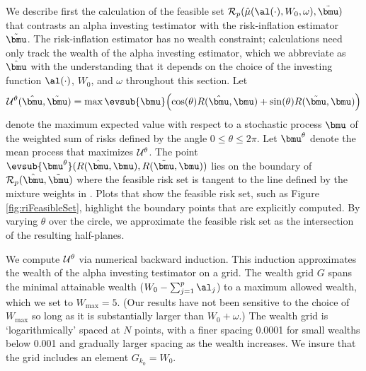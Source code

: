 \documentclass[12pt]{article}
\begin{document}
 We describe first the calculation of the feasible set ${\cal R}_p(\hat\mu(
 \al(\cdot), W_0, \omega), \tilde{\bmu})$ that contrasts an alpha investing
 testimator with the risk-inflation estimator $\tilde{\bmu}$.  The
 risk-inflation estimator has no wealth constraint; calculations need only track
 the wealth of the alpha investing estimator, which we abbreviate as
 $\hat{\bmu}$ with the understanding that it depends on the choice of the
 investing function $\al(\cdot)$, $W_0$, and $\omega$ throughout this section.
  Let
 \begin{equation}
   {\cal U}^\theta(\hat{\bmu},\tilde{\bmu}) = 
       \max \evsub{\bmu} \Bigl(
       \cos(\theta) R(\hat{\bmu}, \bmu) + \sin(\theta) R(\tilde{\bmu},\bmu) 
       \Bigr)
 \label{eq:U}
 \end{equation}
 denote the maximum expected value with respect to a stochastic process $\bmu$
 of the weighted sum of risks defined by the angle $ 0 \le \theta \le 2 \pi$.
  Let $\bmu^\theta$ denote the mean process that maximizes ${\cal U}^\theta$.  The
 point $\evsub{\bmu^\theta}(R(\hat{\bmu}, \bmu), R(\tilde{\bmu}, \bmu))$ lies on
 the boundary of ${\cal R}_p(\hat{\bmu},\tilde{\bmu})$ where the feasible risk
 set is tangent to the line defined by the mixture weights in .  Plots
 that show the feasible risk set, such as Figure \ref{fig:riFeasibleSet},
 highlight the boundary points that are explicitly computed.  By varying
 $\theta$ over the circle, we approximate the feasible risk set as the
 intersection of the resulting half-planes.

 
 We compute ${\cal U}^\theta$ via numerical backward induction.  This induction
 approximates the wealth of the alpha investing testimator on a grid.  The
 wealth grid $G$ spans the minimal attainable wealth ($W_0 - \sum_{j=1}^p
 \al_j$) to a maximum allowed wealth, which we set to $W_{\max} = 5$.  (Our
 results have not been sensitive to the choice of $W_{\max}$ so long as it is
 substantially larger than $W_0 + \omega$.)  The wealth grid is
 `logarithmically' spaced at $N$ points, with a finer spacing 0.0001 for small
 wealths below 0.001 and gradually larger spacing as the wealth increases.  We
 insure that the grid includes an element $G_{k_0} = W_0$.
\end{document}
